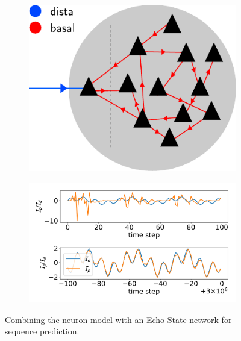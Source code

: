 \documentclass{beamer}
\begin{document}
\begin{frame}[t]
\begin{columns}[t]
\begin{column}{.5\textwidth}

\begin{figure}

\begin{subfigure}{0.3\textwidth}
\centering
\includegraphics[width=\textwidth]{../figures/illustration_echo_state.pdf}
\end{subfigure}
\begin{subfigure}{9.5in}
\centering
\includegraphics[width=\textwidth]{../figures/fig4_right.pdf}
\end{subfigure}
\caption{Combining the neuron model with an Echo State network for sequence prediction.}
\label{fig:Results_4}
\end{figure}


\end{column}
\end{columns}
\end{frame}
\end{document}
